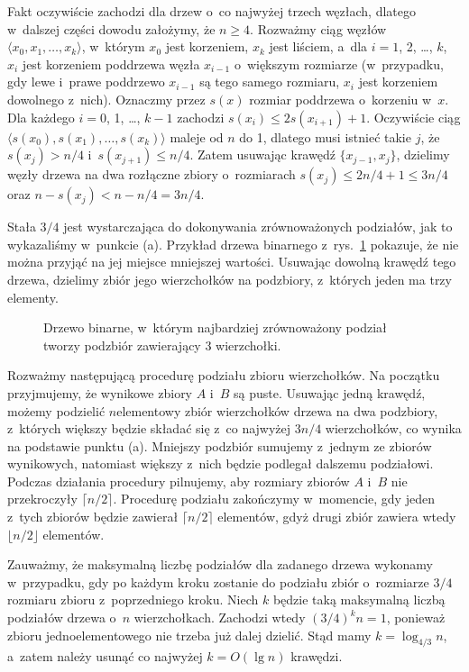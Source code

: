 
\subproblem %
Fakt oczywiście zachodzi dla drzew o~co najwyżej trzech węzłach, dlatego w~dalszej części dowodu założymy, że $n\ge4$.
Rozważmy ciąg węzłów $\langle x_0,x_1,\dots,x_k\rangle$, w~którym $x_0$ jest korzeniem, $x_k$ jest liściem, a~dla $i=1$, 2, \dots, $k$, $x_i$ jest korzeniem poddrzewa węzła $x_{i-1}$ o~większym rozmiarze (w~przypadku, gdy lewe i~prawe poddrzewo $x_{i-1}$ są tego samego rozmiaru, $x_i$ jest korzeniem dowolnego z~nich).
Oznaczmy przez $s(x)$ rozmiar poddrzewa o~korzeniu w~$x$.
Dla każdego $i=0$, 1, \dots, $k-1$ zachodzi $s(x_i)\le2s(x_{i+1})+1$.
Oczywiście ciąg $\langle s(x_0),s(x_1),\dots,s(x_k)\rangle$ maleje od $n$ do 1, dlatego musi istnieć takie $j$, że $s(x_j)>n/4$ i~$s(x_{j+1})\le n/4$.
Zatem usuwając krawędź $\{x_{j-1},x_j\}$, dzielimy węzły drzewa na dwa rozłączne zbiory o~rozmiarach $s(x_j)\le2n/4+1\le3n/4$ oraz $n-s(x_j)<n-n/4=3n/4$.

\subproblem %
Stała $3/4$ jest wystarczająca do dokonywania zrównoważonych podziałów, jak to wykazaliśmy w~punkcie (a).
Przykład drzewa binarnego z~rys.\ \ref{fig:B-3b} pokazuje, że nie można przyjąć na jej miejsce mniejszej wartości.
Usuwając dowolną krawędź tego drzewa, dzielimy zbiór jego wierzchołków na podzbiory, z~których jeden ma trzy elementy.
\begin{figure}[!ht]
	\centering 
	\caption{Drzewo binarne, w~którym najbardziej zrównoważony podział tworzy podzbiór zawierający 3 wierzchołki.} \label{fig:B-3b}
\end{figure}

\subproblem %
Rozważmy następującą procedurę podziału zbioru wierzchołków.
Na początku przyjmujemy, że wynikowe zbiory $A$ i~$B$ są puste.
Usuwając jedną krawędź, możemy podzielić $n$\nbhyphen elementowy zbiór wierzchołków drzewa na dwa podzbiory, z~których większy będzie składać się z~co najwyżej $3n/4$ wierzchołków, co wynika na podstawie punktu (a).
Mniejszy podzbiór sumujemy z~jednym ze zbiorów wynikowych, natomiast większy z~nich będzie podlegał dalszemu podziałowi.
Podczas działania procedury pilnujemy, aby rozmiary zbiorów $A$ i~$B$ nie przekroczyły $\lceil n/2\rceil$.
Procedurę podziału zakończymy w~momencie, gdy jeden z~tych zbiorów będzie zawierał $\lceil n/2\rceil$ elementów, gdyż drugi zbiór zawiera wtedy $\lfloor n/2\rfloor$ elementów.

Zauważmy, że maksymalną liczbę podziałów dla zadanego drzewa wykonamy w~przypadku, gdy po każdym kroku zostanie do podziału zbiór o~rozmiarze $3/4$ rozmiaru zbioru z~poprzedniego kroku.
Niech $k$ będzie taką maksymalną liczbą podziałów drzewa o~$n$ wierzchołkach.
Zachodzi wtedy $(3/4)^kn=1$, ponieważ zbioru jednoelementowego nie trzeba już dalej dzielić.
Stąd mamy $k=\log_{4/3}n$, a~zatem należy usunąć co najwyżej $k=O(\lg n)$ krawędzi.
